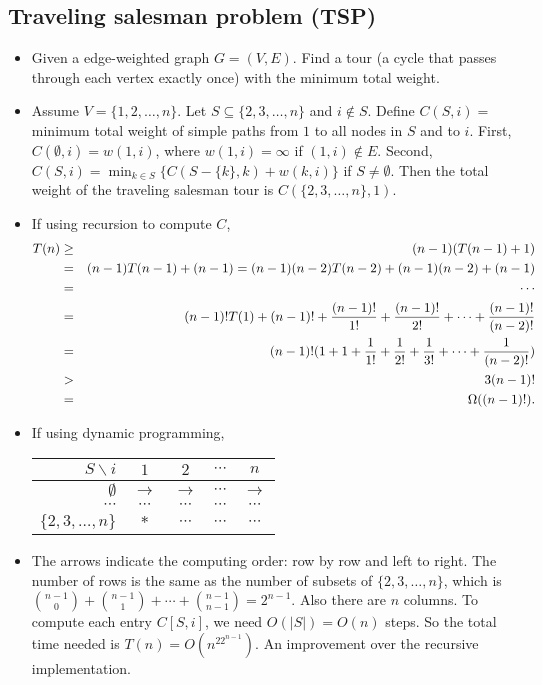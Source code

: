\documentclass{article}
\begin{document}
\subsection{Traveling salesman problem (TSP)}

\begin{itemize}

\item Given a edge-weighted graph $G=(V,E)$. Find a tour (a cycle that
passes through each vertex exactly once) with the minimum total
weight. 

\item Assume $V=\{1,2,\ldots,n\}$. Let $S\subseteq
\{2,3,\ldots,n\}$ and $i\not\in S$.
Define $C(S,i)=$ minimum total weight of simple paths from $1$ to
all nodes in $S$ and to $i$. First, $C(\emptyset,i)=w(1,i)$,
where $w(1,i)=\infty$ if $(1,i)\not\in E$.
Second, $C(S,i)=\min_{k\in S}\{C(S-\{k\},k)+w(k,i)\}$ if
$S\not=\emptyset$. Then the total weight of the traveling
salesman tour is $C(\{2,3,\ldots,n\},1)$.

\item If using recursion to compute $C$, 
\begin{eqnarray*}
T(n)&\ge&(n-1)(T(n-1)+1)\\
&=&(n-1)T(n-1)+(n-1)=(n-1)(n-2)T(n-2)+(n-1)(n-2)+(n-1)\\
&=&\cdots\\
&=&(n-1)!T(1)+(n-1)!+{(n-1)!\over1!}+{(n-1)!\over2!}+\cdots+
{(n-1)!\over (n-2)!}\\
&=&(n-1)!(1+1+{1\over1!}+{1\over2!}+{1\over3!}+\cdots+{1\over(n-2)!})\\
&>&3(n-1)!\\
&=&\Omega((n-1)!).
\end{eqnarray*}

\item If using dynamic programming, 

\begin{center}
\begin{tabular}{r|cccc}
$S\backslash i$ & $1$ & $2$ & $\cdots$ & $n$\\\hline
$\emptyset$ & $\rightarrow$ & $\rightarrow$ & $\cdots$ & $\rightarrow$\\
$\cdots$ & $\cdots$ & $\cdots$ & $\cdots$ & $\cdots$ \\
$\{2,3,\ldots,n\}$ & $*$ & $\cdots$ & $\cdots$ & $\cdots$\\
\end{tabular}
\end{center}

\item The arrows indicate the computing order: row by row and left to right.
The number of rows is the same as the number of subsets of $\{2,3,\ldots,n\}$,
which is ${n-1\choose 0}+{n-1 \choose 1}+\cdots+{n-1 \choose{n-1}}=2^{n-1}$.
Also there are $n$ columns. To compute each entry $C[S,i]$, we need
$O(|S|)=O(n)$ steps. So the total time needed is $T(n)=O(n^22^{n-1})$. An
improvement over the recursive implementation.

\end{itemize}
\end{document}
